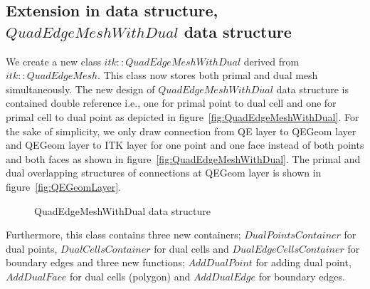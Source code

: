 \documentclass{InsightArticle}
\begin{document}
\subsection{Extension in data structure, $QuadEdgeMeshWithDual$ data structure}
We create a new class $itk::QuadEdgeMeshWithDual$ derived from $itk::QuadEdgeMesh$. This class now stores both primal and dual mesh simultaneously. The new design of $QuadEdgeMeshWithDual$ data structure is contained double reference i.e., one for primal point to dual cell and one for primal cell to dual point as depicted in figure~\ref{fig:QuadEdgeMeshWithDual}. For the sake of simplicity, we only draw connection from QE layer to QEGeom layer and QEGeom layer to ITK layer for one point and one face instead of both points and both faces as shown in figure~\ref{fig:QuadEdgeMeshWithDual}. The primal and dual overlapping structures of connections at QEGeom layer is shown in figure~\ref{fig:QEGeomLayer}.
\begin{figure}
	\centering
	\caption{QuadEdgeMeshWithDual data structure}
	\label{fig:QuadEdgeMeshWithDualFull}
\end{figure}
Furthermore, this class contains three new containers; $DualPointsContainer$ for dual points, $DualCellsContainer$ for dual cells and $DualEdgeCellsContainer$ for boundary edges and three new functions; $AddDualPoint$ for adding dual point, $AddDualFace$ for dual cells (polygon) and $AddDualEdge$ for boundary edges. 
\end{document}
